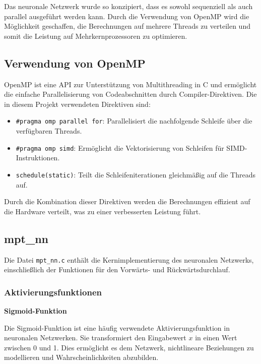 \documentclass[a4paper, 12pt]{article}
\begin{document}
Das neuronale Netzwerk wurde so konzipiert, dass es sowohl sequenziell als auch parallel ausgeführt werden kann. Durch die Verwendung von OpenMP wird die Möglichkeit geschaffen, die Berechnungen auf mehrere Threads zu verteilen und somit die Leistung auf Mehrkernprozessoren zu optimieren.

\subsection{Verwendung von OpenMP}

OpenMP ist eine API zur Unterstützung von Multithreading in C und ermöglicht die einfache Parallelisierung von Codeabschnitten durch Compiler-Direktiven. Die in diesem Projekt verwendeten Direktiven sind:

\begin{itemize}
    \item \texttt{\#pragma omp parallel for}: Parallelisiert die nachfolgende Schleife über die verfügbaren Threads.
    \item \texttt{\#pragma omp simd}: Ermöglicht die Vektorisierung von Schleifen für SIMD-Instruktionen.
    \item \texttt{schedule(static)}: Teilt die Schleifeniterationen gleichmäßig auf die Threads auf.
\end{itemize}

Durch die Kombination dieser Direktiven werden die Berechnungen effizient auf die Hardware verteilt, was zu einer verbesserten Leistung führt.

\subsection{mpt\_nn}
\label{subsec:mpt_nn}

Die Datei \texttt{mpt\_nn.c} enthält die Kernimplementierung des neuronalen Netzwerks, einschließlich der Funktionen für den Vorwärts- und Rückwärtsdurchlauf.

\subsubsection{Aktivierungsfunktionen}

\textbf{Sigmoid-Funktion}

Die Sigmoid-Funktion ist eine häufig verwendete Aktivierungsfunktion in neuronalen Netzwerken. 
Sie transformiert den Eingabewert \( x \) in einen Wert zwischen 0 und 1. 
Dies ermöglicht es dem Netzwerk, nichtlineare Beziehungen zu modellieren und Wahrscheinlichkeiten abzubilden.
\end{document}
